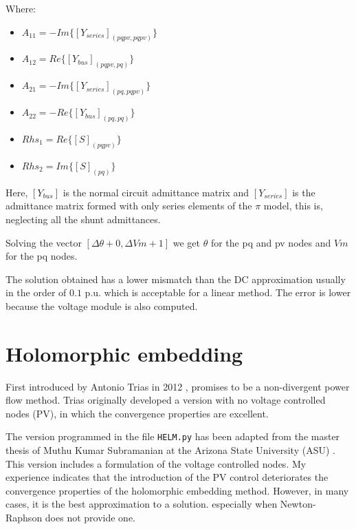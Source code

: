 \documentclass[nols,a4paper,twoside,notoc,fleqn]{tufte-book}
\begin{document}
Where:
\begin{itemize}
	\item $A_{11} = -Im \{ [Y_{series}]_{(pqpv, pqpv)} \}$
	\item $A_{12} = Re \{ [Y_{bus}]_{(pqpv, pq)} \}$
	\item $A_{21} = -Im \{ [Y_{series}]_{(pq, pqpv)} \}$
	\item $A_{22} = -Re \{ [Y_{bus}]_{(pq, pq)} \}$
	\item $Rhs_1 = Re \{ [S]_{(pqpv)} \} $
	\item $Rhs_2 = Im \{ [S]_{(pq)} \} $\newline
\end{itemize}

Here, $[Y_{bus}]$ is the normal circuit admittance matrix and $[Y_{series}]$ is the admittance matrix formed with only series elements of the $\pi$ model, this is, neglecting all the shunt admittances.

Solving the vector $[\Delta \theta + 0, \Delta Vm + 1]$ we get $\theta$ for the pq and pv nodes and $Vm$ for the pq nodes.\newline

%

The solution obtained has a lower mismatch than the DC approximation usually in the order of $0.1$ p.u. which is acceptable for a linear method. The error is lower because the voltage module is also computed.

\section{Holomorphic embedding}

First introduced by Antonio Trias in 2012 \cite{TriasHELM}, promises to be a non-divergent power flow method. Trias originally developed a version with no voltage controlled nodes (PV), in which the convergence properties are excellent. 

The version programmed in the file \verb|HELM.py| has been adapted from the master thesis of Muthu Kumar Subramanian at the Arizona State University (ASU) \cite{subramanian2014application}. This version includes a formulation of the voltage controlled nodes. My experience indicates that the introduction of the PV control deteriorates the convergence properties of the holomorphic embedding method. However, in many cases, it is the best approximation to a solution. especially when Newton-Raphson does not provide one.
\end{document}
